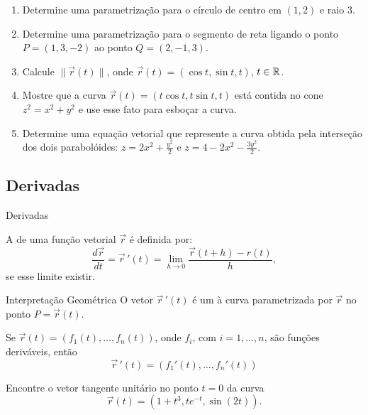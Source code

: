 \begin{frame}[label=fun-vet]
\begin{casa}
\begin{enumerate}
\item Determine uma parametrização para o círculo de centro em $(1,2)$ e raio $3$.
\item Determine uma parametrização para o segmento de reta ligando o ponto $P=(1,3,-2)$ ao ponto $Q=(2,-1,3)$.

\item Calcule $\|\vec{r}(t)\|$, onde $\vec{r}(t)=(\cos t,\sin t, t)$, $t\in \mathbb{R}$.

\item Mostre que a curva $\vec{r}(t)=(t\cos t,t\sin t,t)$ está contida no cone $z^2=x^2+y^2$ e use esse fato para esboçar a curva.

\item Determine uma equação vetorial que represente a curva obtida pela interseção dos dois parabolóides: $z=2x^2+\frac{y^2}{2}$ e $z=4-2x^2-\frac{3y^2}{2}$.
\end{enumerate}
\end{casa}
\end{frame}

\subsection*{Derivadas}
\begin{frame}[label=fun-vet]{Derivadas}
\begin{defin}
A  de uma função vetorial $\vec{r}$ é definida por:
\[\frac{d\vec{r}}{dt}=\vec{r}\,'(t)=\lim\limits_{h\to 0}\frac{\vec{r}(t+h)-r(t)}{h},\]
se esse limite existir.
\end{defin}
\begin{block}{Interpretação Geométrica}
O vetor $\vec{r}\,'(t)$ é um  à curva parametrizada por $\vec{r}$ no ponto $P=\vec{r}(t)$.
\end{block}


\end{frame}

\begin{frame}[label=fun-vet]
\begin{prop}
Se $\vec{r}(t)=\left(f_1(t),\ldots,f_n(t)\right)$, onde $f_i$, com $i=1,\ldots,n$, são funções deriváveis, então
\[\vec{r}\,'(t)=\left(f_1'(t),\ldots,f_n'(t)\right)\]
\end{prop}

\begin{exe}
Encontre o vetor tangente unitário no ponto $t=0$ da curva 
\[\vec{r}(t)=\left(1+t^3,te^{-t},\sin(2t)\right).\]
\end{exe}
\end{frame}

